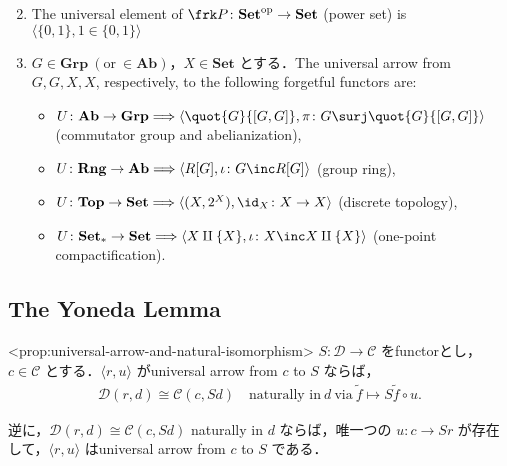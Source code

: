 \documentclass{naughieLuatex}
\newcommand\cat\mathscr
\newcommand\opair[2]{\langle #1, #2 \rangle}
\newcommand\ext\tilde
\newcommand\onept\ast
\newcommand\catb\mathbf
\newcommand\POW{\frk P}
\newcommand\op{\mathrm{op}}
\newcommand\Set{\catb{Set}}
\newcommand\Grp{\catb{Grp}}
\newcommand\Tops{\catb{Top}}
\newcommand\Ab{\catb{Ab}}
\newcommand\Rng{\catb{Rng}}
\begin{document}
\begin{enumerate}[label=(\arabic*)]
  \setcounter{enumi}{1}%
  \item The universal element of $\POW \colon \Set^\op \to \Set$ (power set) is $\opair{\{ 0, 1 \}}{1 \in \{ 0, 1 \}}$
  \item $G \in \Grp \ (\text{or}\ \in \Ab)$，$X \in \Set$ とする．The universal arrow from $G, G, X, X$, respectively, to the following forgetful functors are:
    \begin{itemize}
      \item $U \colon \Ab \to \Grp \Longrightarrow \opair{\quot{G}{[G, G]}}{\pi \colon G \surj \quot{G}{[G, G]}}$ (commutator group and abelianization),
      \item $U \colon \Rng \to \Ab \Longrightarrow \opair{R [G]}{\iota \colon G \inc R [G]}$ (group ring),
      \item $U \colon \Tops \to \Set \Longrightarrow \opair{(X, 2^X)}{\id_X \colon X \to X}$ (discrete topology),
      \item $U \colon \Set_\onept \to \Set \Longrightarrow \opair{X \amalg \{ X \}}{\iota \colon X \inc X \amalg \{ X \}}$ (one-point compactification).
    \end{itemize}
\end{enumerate}

\subsection{The Yoneda Lemma}

\begin{prop}<prop:universal-arrow-and-natural-isomorphism>
  $S \colon \cat D \to \cat C$ をfunctorとし，$c \in \cat C$ とする．$\opair r u$ がuniversal arrow from $c$ to $S$ ならば，
  \begin{align*}
    \cat D (r, d) \cong \cat C (c, S d) \quad \text{naturally in} \ d \ \text{via} \ \ext f \mapsto S \ext f \circ u.
  \end{align*}

  逆に，$\cat D (r, d) \cong \cat C (c, S d)$ naturally in $d$ ならば，唯一つの $u \colon c \to S r$ が存在して，$\opair r u$ はuniversal arrow from $c$ to $S$ である．
\end{prop}
\end{document}
